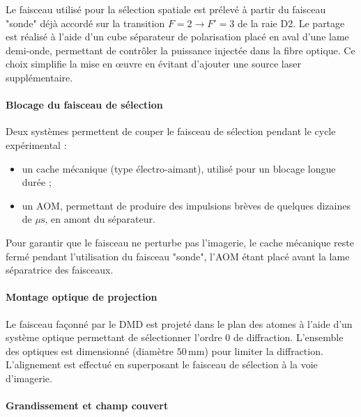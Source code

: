 Le faisceau utilisé pour la sélection spatiale est prélevé à partir du faisceau "sonde" déjà accordé sur la transition \(F=2 \rightarrow F'=3\) de la raie D2. Le partage est réalisé à l’aide d’un cube séparateur de polarisation placé en aval d’une lame demi-onde, permettant de contrôler la puissance injectée dans la fibre optique. Ce choix simplifie la mise en œuvre en évitant d’ajouter une source laser supplémentaire.

\paragraph{Blocage du faisceau de sélection}

Deux systèmes permettent de couper le faisceau de sélection pendant le cycle expérimental :
\begin{itemize}[label=$\bullet$]
    \item un cache mécanique (type électro-aimant), utilisé pour un blocage longue durée ;
    \item un  \gls{AOM}, permettant de produire des impulsions brèves de quelques dizaines de \(\mu\mathrm{s}\), en amont du séparateur.
\end{itemize}

Pour garantir que le faisceau ne perturbe pas l’imagerie, le cache mécanique reste fermé pendant l’utilisation du faisceau "sonde", l’\gls{AOM} étant placé avant la lame séparatrice des faisceaux.

\paragraph{Montage optique de projection}

Le faisceau façonné par le \gls*{DMD} est projeté dans le plan des atomes à l’aide d’un système optique permettant de sélectionner l’ordre 0 de diffraction. L’ensemble des optiques est dimensionné (diamètre \(50\,\mathrm{mm}\)) pour limiter la diffraction. L’alignement est effectué en superposant le faisceau de sélection à la voie d’imagerie.

\paragraph{Grandissement et champ couvert}

